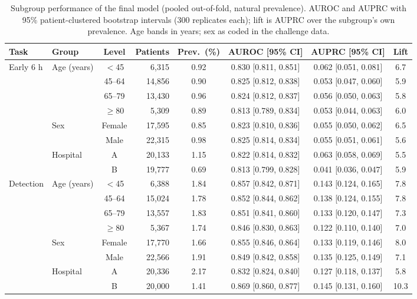 \documentclass[preprint,12pt]{elsarticle}
\begin{document}
\begin{table}[!t]
\centering\scriptsize\setlength{\tabcolsep}{3pt}
\caption{Subgroup performance of the final model (pooled out-of-fold, natural prevalence). AUROC and AUPRC with 95\% patient-clustered bootstrap intervals (300 replicates each); lift is AUPRC over the subgroup's own prevalence. Age bands in years; sex as coded in the challenge data.}
\label{tab:subgroups}
\begin{adjustbox}{max width=\linewidth}
\begin{tabular}{llcrcccc}
\toprule
Task & Group & Level & Patients & Prev.\ (\%) & AUROC [95\% CI] & AUPRC [95\% CI] & Lift \\
\midrule
Early 6 h & Age (years) & $<$45 & 6{,}315 & 0.92 & 0.830 [0.811, 0.851] & 0.062 [0.051, 0.081] & 6.7 \\
 &  & 45--64 & 14{,}856 & 0.90 & 0.825 [0.812, 0.838] & 0.053 [0.047, 0.060] & 5.9 \\
 &  & 65--79 & 13{,}430 & 0.96 & 0.824 [0.812, 0.837] & 0.056 [0.050, 0.063] & 5.8 \\
 &  & $\geq$80 & 5{,}309 & 0.89 & 0.813 [0.789, 0.834] & 0.053 [0.044, 0.063] & 6.0 \\
 & Sex & Female & 17{,}595 & 0.85 & 0.823 [0.810, 0.836] & 0.055 [0.050, 0.062] & 6.5 \\
 &  & Male & 22{,}315 & 0.98 & 0.825 [0.814, 0.834] & 0.055 [0.051, 0.061] & 5.6 \\
 & Hospital & A & 20{,}133 & 1.15 & 0.822 [0.814, 0.832] & 0.063 [0.058, 0.069] & 5.5 \\
 &  & B & 19{,}777 & 0.69 & 0.813 [0.799, 0.828] & 0.041 [0.036, 0.047] & 5.9 \\
\midrule
Detection & Age (years) & $<$45 & 6{,}388 & 1.84 & 0.857 [0.842, 0.871] & 0.143 [0.124, 0.165] & 7.8 \\
 &  & 45--64 & 15{,}024 & 1.78 & 0.852 [0.844, 0.862] & 0.138 [0.124, 0.155] & 7.8 \\
 &  & 65--79 & 13{,}557 & 1.83 & 0.851 [0.841, 0.860] & 0.133 [0.120, 0.147] & 7.3 \\
 &  & $\geq$80 & 5{,}367 & 1.74 & 0.846 [0.830, 0.863] & 0.122 [0.110, 0.140] & 7.0 \\
 & Sex & Female & 17{,}770 & 1.66 & 0.855 [0.846, 0.864] & 0.133 [0.119, 0.146] & 8.0 \\
 &  & Male & 22{,}566 & 1.91 & 0.849 [0.842, 0.858] & 0.135 [0.125, 0.149] & 7.1 \\
 & Hospital & A & 20{,}336 & 2.17 & 0.832 [0.824, 0.840] & 0.127 [0.118, 0.137] & 5.8 \\
 &  & B & 20{,}000 & 1.41 & 0.869 [0.860, 0.877] & 0.145 [0.131, 0.160] & 10.3 \\
\bottomrule
\end{tabular}
\end{adjustbox}
\end{table}
\end{document}
